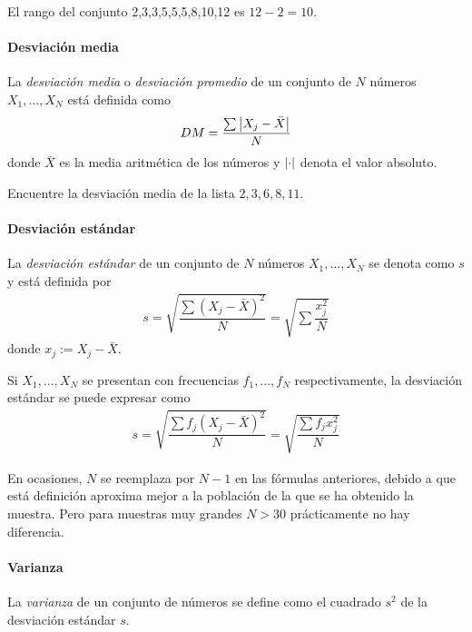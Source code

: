 \begin{ejemplo}
 El rango del conjunto 2,3,3,5,5,5,8,10,12 es $12-2=10.$
\end{ejemplo}


\paragraph{Desviación media}
La \emph{desviación media} o \emph{desviación promedio} de un conjunto de $N$ números $X_{1},...,X_{N}$ está definida como
\begin{align}
DM=\dfrac{\sum \left|X_{j}-\bar{X}\right|}{N}
\end{align}
donde $\bar{X}$ es la media aritmética de los números y $\left|\cdot\right|$ denota el valor absoluto.


\begin{ejemplo}
 Encuentre la desviación media de la lista $2,3,6,8,11.$
\end{ejemplo}


\paragraph{Desviación estándar}
La \emph{desviación estándar} de un conjunto de $N$ números $X_{1},...,X_{N}$ se denota como $s$ y está definida por
\begin{align}
s=\sqrt{\dfrac{\sum\left( X_{j}-\bar{X} \right)^{2}}{N}}=\sqrt{\sum\dfrac{x_{j}^{2}}{N}}
\end{align} donde $x_{j}:=X_{j}-\bar{X}.$


Si $X_{1},...,X_{N}$ se presentan con frecuencias $f_{1},...,f_{N}$ respectivamente, la desviación estándar se puede expresar como
\begin{align}
s=\sqrt{\dfrac{\sum f_{j}\left( X_{j}-\bar{X} \right)^{2}}{N}}=\sqrt{\dfrac{\sum f_{j}x_{j}^{2}}{N}}
\end{align}


 \begin{rem}
  En ocasiones, $N$ se reemplaza por $N-1$ en las fórmulas anteriores, debido a que está definición aproxima mejor a la población de la que se ha obtenido la muestra. Pero para muestras muy grandes $N>30$ prácticamente no hay diferencia.
 \end{rem}


\paragraph{Varianza}
La \emph{varianza} de un conjunto de números se define como el cuadrado $s^{2}$ de la desviación estándar $s$.


